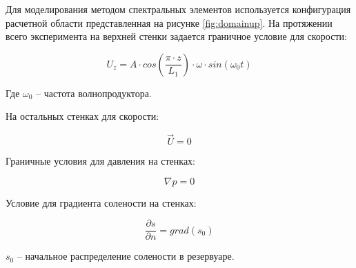 Для моделирования методом спектральных элементов используется конфигурация расчетной области представленная на рисунке \ref{fig:domainup}. На протяжении всего эксперимента на верхней стенки задается граничное условие для скорости:

\begin{equation}
    U_z = A\cdot cos\left(\frac{\pi \cdot z}{L_1}\right)\cdot \omega \cdot  sin(\omega_0 t)
\end{equation}

Где $\omega_0$ -- частота волнопродуктора. 

На остальных стенках для скорости:

\begin{equation}
    \vec{U} = 0
\end{equation}

Граничные условия для давления на стенках:

\begin{equation}
    \nabla p = 0
\end{equation}

Условие для градиента солености на стенках:

\begin{equation}
    \frac{\partial s}{\partial n} = grad(s_0)
\end{equation}

$s_0$ -- начальное распределение солености в резервуаре.

